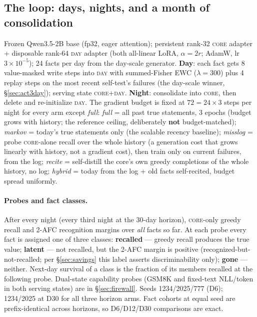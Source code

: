 \documentclass[11pt]{article}
\newcommand{\qwen}{Qwen3.5-2B}
\begin{document}
\subsection{The loop: days, nights, and a month of consolidation}\label{sec:loopinstrument}

Frozen \qwen{} base (fp32, eager attention); persistent rank-32 \textsc{core} adapter +
disposable rank-64 \textsc{day} adapter (both all-linear LoRA, $\alpha{=}2r$; AdamW, lr
$3{\times}10^{-5}$); 24 facts per day from the day-scale generator. \textbf{Day}: each fact gets
8 value-masked write steps into \textsc{day} with summed-Fisher EWC ($\lambda{=}300$) plus 4
replay steps on the most recent self-test's failures (the day-scale winner,
\S\ref{sec:act3day}); serving state \textsc{core+day}. \textbf{Night}: consolidate into
\textsc{core}, then delete and re-initialize \textsc{day}. The gradient budget is fixed at $72 =
24\times3$ steps per night for every arm except \emph{full}: \emph{full} = all past true
statements, 3 epochs (budget grows with history; the reference ceiling, deliberately \textbf{not}
budget-matched); \emph{markov} = today's true statements only (the scalable recency baseline);
\emph{misslog} = probe \textsc{core}-alone recall over the whole history (a generation cost that
grows linearly with history, not a gradient cost), then train only on current failures, from the
log; \emph{recite} = self-distill the core's own greedy completions of the whole history, no log;
\emph{hybrid} = today from the log + old facts self-recited, budget spread uniformly.

\paragraph{Probes and fact classes.} After every night (every third night at the 30-day horizon),
\textsc{core}-only greedy recall and 2-AFC recognition margins over \emph{all} facts so far. At
each probe every fact is assigned one of three classes: \textbf{recalled} --- greedy recall
produces the true value; \textbf{latent} --- not recalled, but the 2-AFC margin is positive
(recognized-but-not-recalled; per \S\ref{sec:savings} this label asserts discriminability only);
\textbf{gone} --- neither. Next-day survival of a class is the fraction of its members recalled
at the following probe. Dual-state capability probes (GSM8K and fixed-text NLL/token in both
serving states) are in \S\ref{sec:firewall}. Seeds 1234/2025/777 (D6); 1234/2025 at D30 for all
three horizon arms. Fact cohorts at equal seed are prefix-identical across horizons, so
D6/D12/D30 comparisons are exact.
\end{document}
